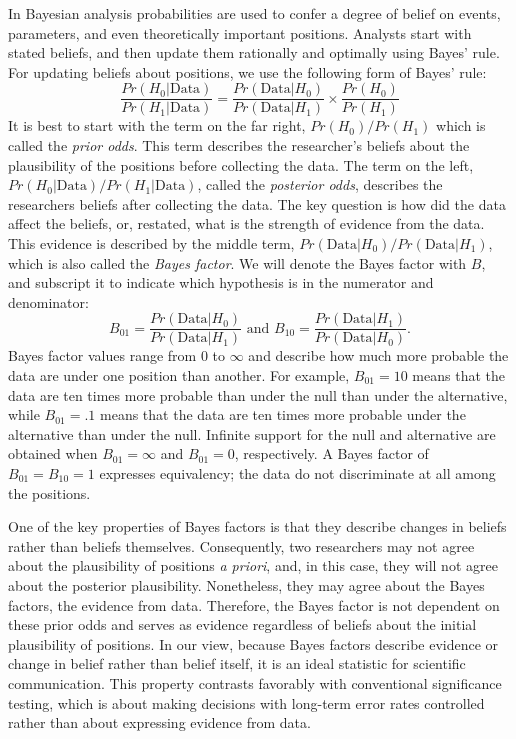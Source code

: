 \documentclass[man]{apa6}
\begin{document}
In Bayesian analysis probabilities are used to confer a degree of belief on events, parameters, and even theoretically important positions.  Analysts start with stated beliefs, and then update them rationally and optimally using Bayes' rule.  For updating beliefs about positions, we use the following form of Bayes' rule:
\begin{equation}
\frac{Pr(H_0 | \mbox{Data})}{Pr(H_1 | \mbox{Data})} = \frac{Pr(\mbox{Data} | H_0)}{Pr(\mbox{Data} | H_1)} \times \frac{Pr(H_0)}{Pr (H_1)} 
\end{equation}
It is best to start with the term on the far right, $Pr(H_0)/Pr(H_1)$ which is called the {\em prior odds}.  This term describes the researcher's beliefs about the plausibility of the positions before collecting the data.  The term on the left, $Pr(H_0 | \mbox{Data})/Pr(H_1 | \mbox{Data})$, called the {\em posterior odds}, describes the researchers beliefs after collecting the data.   The key question is how did the data affect the beliefs, or, restated, what is the strength of evidence from the data.  This evidence is described by the middle term,  $Pr(\mbox{Data} | H_0)/Pr(\mbox{Data} | H_1)$, which is also called the {\em Bayes factor}.  We will denote the Bayes factor with $B$, and subscript it to indicate which hypothesis is in the numerator and denominator:
\[
B_{01} = \frac{Pr(\mbox{Data} | H_0)}{Pr(\mbox{Data} | H_1)} \mbox{ and } B_{10} = \frac{Pr(\mbox{Data} | H_1)}{Pr(\mbox{Data} | H_0)}.
\]
Bayes factor values range from 0 to $\infty$ and describe how much more probable the data are under one position than another.  For example, $B_{01}=10$ means that the data are ten times more probable than under the null than under the alternative, while $B_{01}=.1$ means that the data are ten times more probable under the alternative than under the null.  Infinite support for the null and alternative are obtained when $B_{01}=\infty$ and $B_{01}=0$, respectively.  A Bayes factor of $B_{01}=B_{10}=1$ expresses equivalency; the data do not discriminate at all among the positions.

One of the key properties of Bayes factors is that they describe changes in beliefs rather than beliefs themselves.  Consequently, two researchers may not agree about the plausibility of positions {\em a priori}, and, in this case, they will not agree about the posterior plausibility.  Nonetheless, they may agree about the Bayes factors, the evidence from data.  Therefore, the Bayes factor is not dependent on these prior odds and serves as evidence regardless of beliefs about the initial plausibility of positions.  In our view, because Bayes factors describe evidence or change in belief rather than belief itself, it is an ideal statistic for scientific communication.  This property contrasts favorably with conventional significance testing, which is about making decisions with long-term error rates controlled rather than about expressing evidence from data. 
\end{document}
